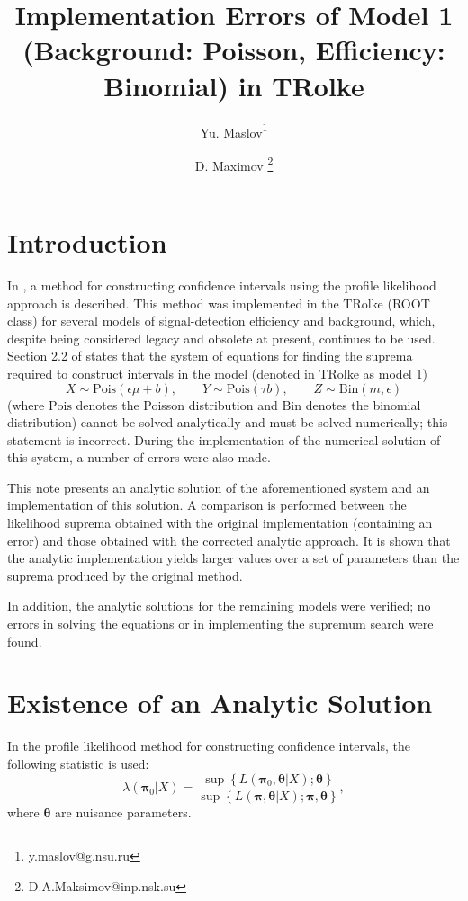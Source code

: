 \documentclass[12pt]{article}
\title{Implementation Errors of Model 1 (Background: Poisson, Efficiency: Binomial) in TRolke}
\date{}
\author[1]{Yu. Maslov\thanks{y.maslov@g.nsu.ru}}
\author[2]{D. Maximov \thanks{D.A.Maksimov@inp.nsk.su}}
\affil[1]{Novosibirsk State University, Novosibirsk, Russia}
\affil[2]{Budker Institute of Nuclear Physics, Novosibirsk, Russia}
\begin{document}
\maketitle{}
\vspace{-5em}

\section{Introduction}
In \cite{Rolke_paper}, a method for constructing confidence intervals using the profile likelihood approach is described.
This method was implemented in the TRolke (ROOT class) for several models of signal-detection efficiency and background, which, despite being considered legacy and obsolete at present, continues to be used.
Section 2.2 of \cite{Rolke_paper} states that the system of equations for finding the suprema required to construct intervals in the model (denoted in TRolke as model 1)
$$X\sim \mathrm{Pois}(\epsilon \mu +b),\qquad Y\sim \mathrm{Pois}(\tau b),\qquad Z\sim \mathrm{Bin}(m,\epsilon)$$
(where $\mathrm{Pois}$ denotes the Poisson distribution and $\mathrm{Bin}$ denotes the binomial distribution)
cannot be solved analytically and must be solved numerically; this statement is incorrect.
During the implementation of the numerical solution of this system, a number of errors were also made.

This note presents an analytic solution of the aforementioned system and an implementation of this solution. A comparison is performed between the likelihood suprema obtained with the original implementation (containing an error) and those obtained with the corrected analytic approach.
It is shown that the analytic implementation yields larger values over a set of parameters than the suprema produced by the original method.

In addition, the analytic solutions for the remaining models were verified; no errors in solving the equations or in implementing the supremum search were found.

\section{Existence of an Analytic Solution}

In the profile likelihood method for constructing confidence intervals, the following statistic is used:
$$\lambda \left(\mathbf{\pi}_0 | X\right) = \frac{\sup\left\{ L \left(\mathbf{\pi}_0, \mathbf{\theta } | X\right); \mathbf{\theta } \right\} } {\sup\left\{ L \left(\mathbf{\pi}, \mathbf{\theta } | X\right); \mathbf{\pi}, \mathbf{\theta } \right\}} ,$$
where $\mathbf{\theta }$ are nuisance parameters.
\end{document}
